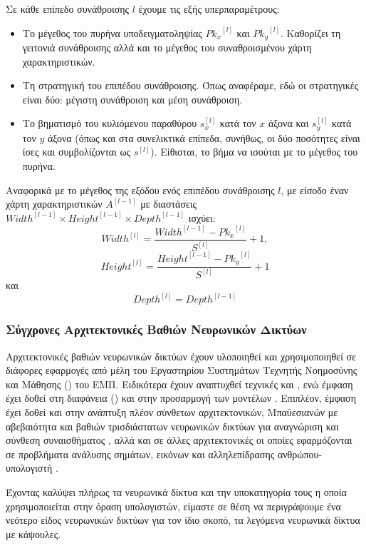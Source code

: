Σε κάθε επίπεδο συνάθροισης $l$ έχουμε τις εξής υπερπαραμέτρους:
\begin{itemize}
  \item Το μέγεθος του πυρήνα υποδειγματοληψίας ${Pk_x}^{[l]}$ και ${Pk_y}^{[l]}$. Καθορίζει τη γειτονιά συνάθροισης αλλά και το μέγεθος του συναθροισμένου χάρτη χαρακτηριστικών.
  \item Τη στρατηγική του επιπέδου συνάθροισης. Όπως αναφέραμε, εδώ οι στρατηγικές είναι δύο: μέγιστη συνάθροιση και μέση συνάθροιση.
  \item Το βηματισμό του κυλιόμενου παραθύρου $s^{[l]}_x$ κατά τον $x$ άξονα και $s^{[l]}_y$ κατά τον $y$ άξονα (όπως και στα συνελικτικά επίπεδα, συνήθως, οι δύο ποσότητες είναι ίσες και συμβολίζονται ως $s^{[l]}$). Είθισται, το βήμα να ισούται με το μέγεθος του πυρήνα.
\end{itemize}

Αναφορικά με το μέγεθος της εξόδου ενός επιπέδου συνάθροισης $l$, με είσοδο έναν χάρτη χαρακτηριστικών $A^{[l-1]}$ με διαστάσεις ${Width}^{[l-1]} \times {Height}^{[l-1]}\times{Depth}^{[l-1]}$ ισχύει:
\begin{equation}
  {Width}^{[l]}= \frac{{Width}^{[l-1]}-{Pk_x}^{[l]}}{S^{[l]}} + 1,
  \end{equation}
  \begin{equation}
    {Height}^{[l]}=\frac{{Height}^{[l-1]}-{Pk_y}^{[l]}}{S^{[l]}} + 1
  \end{equation}
  και
  \begin{equation}
    {Depth}^{[l]}={Depth}^{[l-1]}
  \end{equation}


\subsubsection{Σύγχρονες Αρχιτεκτονικές Βαθιών Νευρωνικών Δικτύων}

Αρχιτεκτονικές βαθιών νευρωνικών δικτύων έχουν υλοποιηθεί και  χρησιμοποιηθεί σε διάφορες εφαρμογές από μέλη του Εργαστηρίου Συστημάτων Τεχνητής Νοημοσύνης και Μάθησης () του ΕΜΠ. Ειδικότερα έχουν αναπτυχθεί τεχνικές  και  \cite{kollias2018deep,kol2019predicting,arsenos2022large}, ενώ έμφαση έχει δοθεί στη διαφάνεια () και στην προσαρμογή των μοντέλων \cite{kollias2017adaptation,kollias2020deep5,kollias2020transparent}. Επιπλέον, έμφαση έχει δοθεί και στην ανάπτυξη πλέον σύνθετων αρχιτεκτονικών, Μπαϋεσιανών  με αβεβαιότητα και βαθιών τρισδιάστατων νευρωνικών δικτύων για αναγνώριση και σύνθεση συναισθήματος \cite{de2020deep,psaroudakis2022mixaugment,refsk10,kollias2020va,caridakis10synthesizing}, αλλά και σε άλλες αρχιτεκτονικές οι οποίες εφαρμόζονται σε προβλήματα ανάλυσης σημάτων, εικόνων και αλληλεπίδρασης ανθρώπου-υπολογιστή \cite{alhnaity2021autoencoder,mylonas2009using,kollias1991unified,tzouveli2008adaptive}. 
\par
Έχοντας καλύψει πλήρως τα νευρωνικά δίκτυα και την υποκατηγορία τους η οποία χρησιμοποιείται στην όραση υπολογιστών, είμαστε σε θέση να περιγράψουμε ένα νεότερο είδος νευρωνικών δικτύων για τον ίδιο σκοπό, τα λεγόμενα νευρωνικά δίκτυα με κάψουλες.


